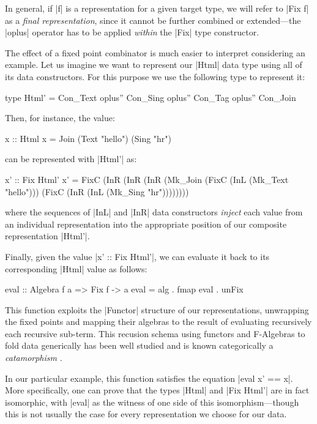 In general, if |f| is a representation for a given target type, we will refer to
|Fix f| as a \emph{final representation}, since it cannot be further combined or
extended---the |oplus| operator has to be applied \emph{within} the |Fix| type
constructor.


The effect of a fixed point combinator is much easier to interpret considering
an example.
%
Let us imagine we want to represent our |Html| data type using all of its data
constructors.
%
For this purpose we use the following type to represent it:

\begin{code}
type Html' = Con_Text oplus'' Con_Sing oplus'' Con_Tag oplus'' Con_Join
\end{code}
%
Then, for instance, the value:

\begin{code}
  x :: Html
  x = Join (Text "hello") (Sing "hr")
\end{code}
%
can be represented with |Html'| as:

\begin{code}
  x' ::  Fix Html'
  x' =   FixC  (InR  (InR (InR (Mk_Join
               (FixC (InL (Mk_Text "hello")))
               (FixC (InR (InL (Mk_Sing "hr"))))))))
\end{code}
%
where the sequences of |InL| and |InR| data constructors \emph{inject} each
value from an individual representation into the appropriate position of our
composite representation |Html'|.


Finally, given the value |x' :: Fix Html'|, we can evaluate it back to its
corresponding |Html| value as follows:

\begin{code}
eval :: Algebra f a => Fix f -> a
eval = alg . fmap eval . unFix
\end{code}
%
This function exploits the |Functor| structure of our representations,
unwrapping the fixed points and mapping their algebras to the result of
evaluating recursively each recursive sub-term.
%
This recusion schema using functors and F-Algebras to fold data generically has
been well studied and is known categorically a \emph{catamorphism} \tocite.

In our particular example, this function satisfies the equation |eval x' == x|.
%
More specifically, one can prove that the types |Html| and |Fix Html'| are in
fact isomorphic, with |eval| as the witness of one side of this
isomorphism---though this is not usually the case for every representation we
choose for our data.



